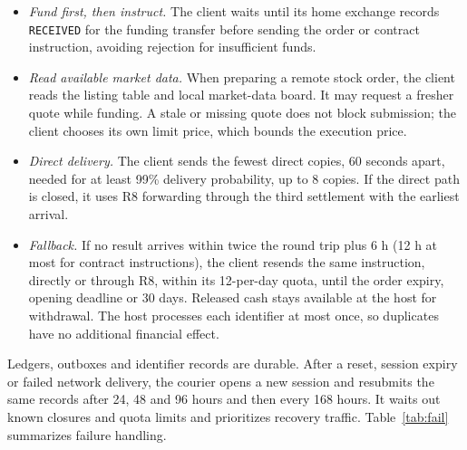 \documentclass[10pt,letterpaper]{article}
\makeatletter
\renewcommand\subsection{\@startsection{subsection}{2}{\z@}{-6pt plus -2pt minus -1pt}{2pt}{\normalfont\normalsize\bfseries}}
\makeatother
\begin{document}
\begin{itemize}\setlength{\itemsep}{1pt}
\item \emph{Fund first, then instruct.}
The client waits until its home exchange records \texttt{RECEIVED} for the funding transfer before sending the order
or contract instruction, avoiding rejection for insufficient funds.

\item \emph{Read available market data.}
When preparing a remote stock order, the client reads the listing table and local market-data board. It may request
a fresher quote while funding. A stale or missing quote does not block submission; the client chooses its own limit
price, which bounds the execution price.

\item \emph{Direct delivery.}
The client sends the fewest direct copies, 60 seconds apart, needed for at least 99\% delivery probability, up to
8 copies. If the direct path is closed, it uses R8 forwarding through the third settlement with the earliest arrival.

\item \emph{Fallback.}
If no result arrives within twice the round trip plus 6 h (12 h at most for contract instructions), the client
resends the same instruction, directly or through R8, within its 12-per-day quota, until the order expiry,
opening deadline or 30 days. Released cash stays available at the host for withdrawal. The host processes each identifier at
most once, so duplicates have no additional financial effect.
\end{itemize}

\subsection{R7: Recovery}
Ledgers, outboxes and identifier records are durable. After a reset, session expiry or failed network delivery, the
courier opens a new session and resubmits the same records after 24, 48 and 96 hours and then every 168 hours. It
waits out known closures and quota limits and prioritizes recovery traffic. Table~\ref{tab:fail} summarizes failure
handling.
\end{document}

